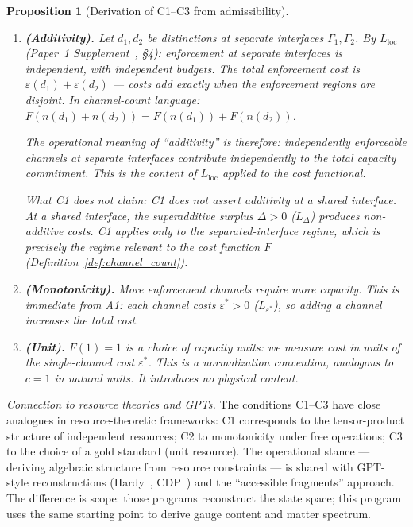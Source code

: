 \documentclass[11pt,a4paper]{article}
\newtheorem{proposition}[theorem]{Proposition}
\theoremstyle{definition}
\begin{document}
\begin{proposition}[Derivation of C1--C3 from admissibility]\label{prop:C1C3}
\leavevmode
\begin{enumerate}[label=\textbf{C\arabic*},nosep,leftmargin=3em]
  \item \textbf{(Additivity).}  Let $d_1, d_2$ be distinctions at
  \emph{separate} interfaces $\Gamma_1, \Gamma_2$.  By $L_{\mathrm{loc}}$
  (Paper~1 Supplement~\cite{BrookeSupplement}, \S4): enforcement at separate
  interfaces is independent, with independent budgets.  The total
  enforcement cost is $\varepsilon(d_1) + \varepsilon(d_2)$ --- costs
  add exactly when the enforcement regions are disjoint.  In channel-count
  language: $F(n(d_1) + n(d_2)) = F(n(d_1)) + F(n(d_2))$.

  The operational meaning of ``additivity'' is therefore:
  \emph{independently enforceable channels at separate interfaces
  contribute independently to the total capacity commitment.}  This is
  the content of $L_{\mathrm{loc}}$ applied to the cost functional.

  \textit{What C1 does not claim:} C1 does not assert additivity at a
  \emph{shared} interface.  At a shared interface, the superadditive
  surplus $\Delta > 0$ ($L_\Delta$) produces non-additive costs.
  C1 applies only to the separated-interface regime, which is precisely
  the regime relevant to the cost function $F$ (Definition~\ref{def:channel_count}).

  \item \textbf{(Monotonicity).}  More enforcement channels require
  more capacity.  This is immediate from A1: each channel costs
  $\varepsilon^* > 0$ ($L_{\varepsilon^*}$), so adding a channel
  increases the total cost.

  \item \textbf{(Unit).}  $F(1) = 1$ is a choice of capacity units:
  we measure cost in units of the single-channel cost $\varepsilon^*$.
  This is a normalization convention, analogous to $c = 1$ in natural
  units.  It introduces no physical content.
\end{enumerate}
\end{proposition}

\noindent\textit{Connection to resource theories and GPTs.}\quad
The conditions C1--C3 have close analogues in resource-theoretic
frameworks: C1 corresponds to the tensor-product structure of
independent resources; C2 to monotonicity under free operations; C3
to the choice of a gold standard (unit resource).  The operational
stance --- deriving algebraic structure from resource constraints ---
is shared with GPT-style reconstructions (Hardy~\cite{Hardy2001},
CDP~\cite{CDP2011}) and the ``accessible fragments'' approach.  The
difference is scope: those programs reconstruct the state space; this
program uses the same starting point to derive gauge content and
matter spectrum.
\end{document}

